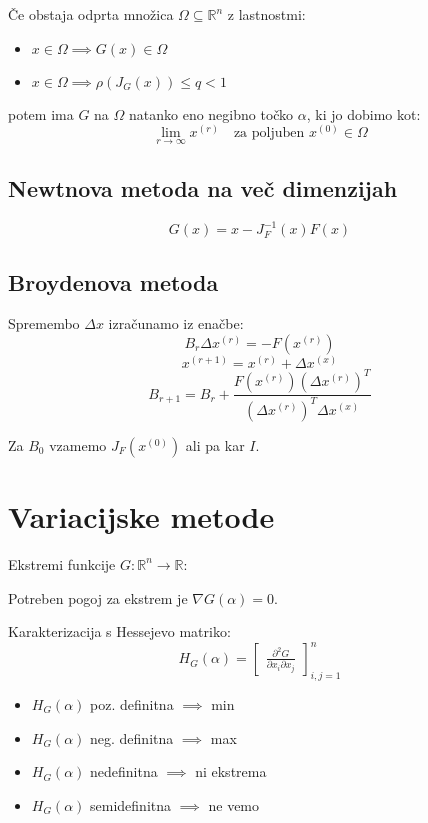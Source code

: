 \begin{multicols}{5}
Če obstaja odprta množica $\Omega \subseteq \mathbb{R}^n$ z lastnostmi:
\begin{itemize}
	\item $x \in \Omega \implies G(x) \in \Omega$
	\item $x \in \Omega \implies \rho(J_G(x)) \leq q < 1$
\end{itemize}
potem ima $G$ na $\Omega$ natanko eno negibno točko $\alpha$, ki jo dobimo kot:
\[ \lim_{r\to \infty} x^{(r)} \quad \text{za poljuben } x^{(0)} \in \Omega \]

\subsection{Newtnova metoda na več dimenzijah}
\[ G(x) = x - J_F^{-1}(x) F(x) \]

\subsection{Broydenova metoda}
Spremembo $\Delta x$ izračunamo iz enačbe:
\[ B_r \Delta x^{(r)} = -F(x^{(r)})\]
\[ x^{(r+1)} = x^{(r)} + \Delta x^{(x)}\]
\[ B_{r+1} = B_r + \frac{F(x^{(r)})(\Delta x^{(r)})^T}{ (\Delta x^{(r)})^T \Delta x^{(x)}}\]

Za $B_0$ vzamemo $J_F(x^{(0)})$ ali pa kar $I$.

\section{Variacijske metode}
Ekstremi funkcije $G: \mathbb{R}^n \to \mathbb{R}$:

Potreben pogoj za ekstrem je $\nabla G(\alpha) = 0$.

Karakterizacija s Hessejevo matriko:
\[ H_G (\alpha) = \begin{bmatrix}
	\frac{\partial^2 G}{\partial x_i \partial x_j}
\end{bmatrix}_{i,j  = 1}^n
\]
\begin{itemize}
	\item $H_G(\alpha)$ poz. definitna $\implies$ min
	\item $H_G(\alpha)$ neg. definitna $\implies$ max
	\item $H_G(\alpha)$ nedefinitna $\implies$ ni ekstrema
	\item $H_G(\alpha)$ semidefinitna $\implies$ ne vemo
\end{itemize}


\end{multicols}
